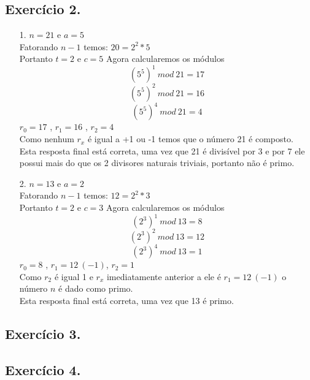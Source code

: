\documentclass[12pt]{article}
\begin{document}
\subsection*{Exercício 2.}
	\begin{itemize}
		\item[1. ]
			$n = 21$ e $a = 5$\\
			Fatorando $n-1$ temos: $20 = 2^2*5$\\
			Portanto $t = 2$ e $c = 5$
			Agora calcularemos os módulos
			$$(5^5)^1 \ mod \ 21 = 17$$
			$$(5^5)^2 \ mod \ 21 = 16$$
			$$(5^5)^4 \ mod \ 21 = 4$$
			$r_0 = 17$ , $r_1 = 16$ , $r_2 = 4$\\
			Como nenhum $r_x$ é igual a +1 ou -1 temos que o número 21 é composto.\\
			Esta resposta final está correta, uma vez que 21 é divisível por 3 e por 7
			ele possui mais do que os 2 divisores naturais triviais, portanto não é primo.
		\item[2. ]
			$n = 13$ e $a = 2$\\
			Fatorando $n-1$ temos: $12 = 2^2*3$\\
			Portanto $t = 2$ e $c = 3$
			Agora calcularemos os módulos
			$$(2^3)^1 \ mod \ 13 = 8$$
			$$(2^3)^2 \ mod \ 13 = 12$$
			$$(2^3)^4 \ mod \ 13 = 1$$
			$r_0 = 8$ , $r_1 = 12 \ (-1)$, $r_2 = 1$\\
			Como $r_2$ é igual 1 e $r_x$ imediatamente anterior a ele é 
			$r_1 = 12 \ (-1)$ o número $n$ é dado como primo.\\
			Esta resposta final está correta, uma vez que 13 é primo.	
	\end{itemize}
\subsection*{Exercício 3.}
\subsection*{Exercício 4.}
\end{document}
